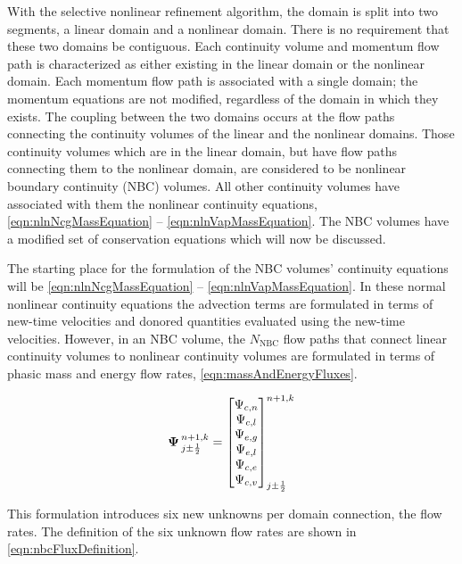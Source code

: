 With the selective nonlinear refinement algorithm, the domain is split into two segments, a linear domain and a nonlinear domain.
There is no requirement that these two domains be contiguous.
Each continuity volume and momentum flow path is characterized as either existing in the linear domain or the nonlinear domain.
Each momentum flow path is associated with a single domain; the momentum equations are not modified, regardless of the domain in which they exists.
The coupling between the two domains occurs at the flow paths connecting the continuity volumes of the linear and the nonlinear domains.
Those continuity volumes which are in the linear domain, but have flow paths connecting them to the nonlinear domain, are considered to be nonlinear boundary continuity (NBC) volumes.
All other continuity volumes have associated with them the nonlinear continuity equations, \eqref{eqn:nlnNcgMassEquation} -- \eqref{eqn:nlnVapMassEquation}.
The NBC volumes have a modified set of conservation equations which will now be discussed.

The starting place for the formulation of the NBC volumes' continuity equations will be \eqref{eqn:nlnNcgMassEquation} -- \eqref{eqn:nlnVapMassEquation}.
In these normal nonlinear continuity equations the advection terms are formulated in terms of new-time velocities and donored quantities evaluated using the new-time velocities.
However, in an NBC volume, the $N_{\text{NBC}}$ flow paths that connect linear continuity volumes to nonlinear continuity volumes are formulated in terms of phasic mass and energy flow rates, \eqref{eqn:massAndEnergyFluxes}.

\begin{equation}
\label{eqn:massAndEnergyFluxes}
\vec{\Psi}^{n+1, k}_{j \pm \onehalf} = \begin{bmatrix}
\Psi_{c, n} \\
\Psi_{c, l} \\
\Psi_{e, g} \\
\Psi_{e, l} \\
\Psi_{c, e} \\
\Psi_{c, v} \\
\end{bmatrix}^{n+1, k}_{j \pm \onehalf}
\end{equation}

This formulation introduces six new unknowns per domain connection, the flow rates.
The definition of the six unknown flow rates are shown in \eqref{eqn:nbcFluxDefinition}.

